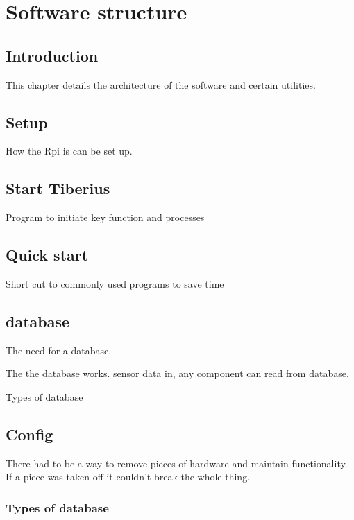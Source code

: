 \section{Software structure}
\pagestyle{aidan}

\subsection{Introduction}
This chapter details the architecture of the software and certain utilities.

\subsection{Setup}
How the Rpi is can be set up.

\subsection{Start Tiberius}
Program to initiate key function and processes

\subsection{Quick start}
Short cut to commonly used programs to save time

\subsection{database}
The need for a database.

The the database works. sensor data in, any component can read from database.

Types of database

\subsection{Config}
There had to be a way to remove pieces of hardware and maintain functionality. If a piece was taken off it couldn't break the whole thing.


\subsubsection{Types of database}





